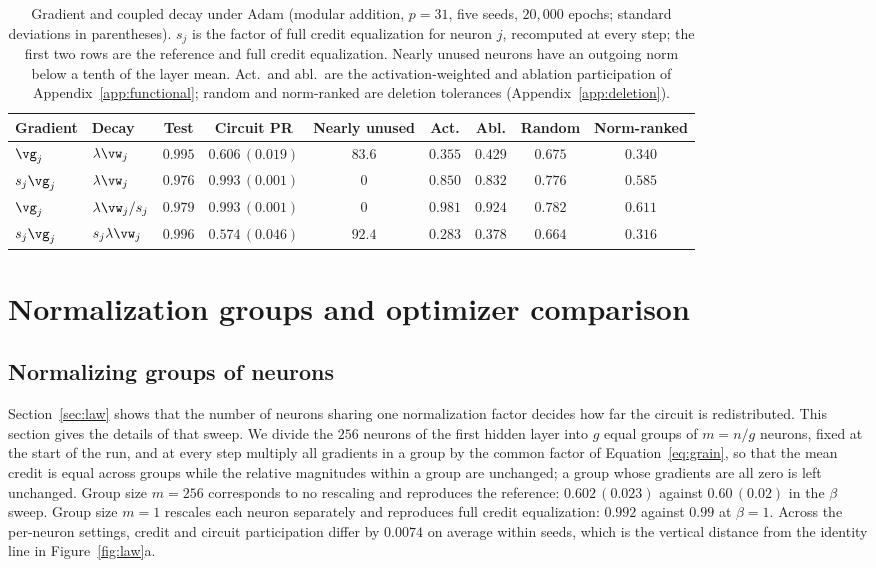 \documentclass{article} %
\begin{document}
\begin{table}[!ht]
\caption{Gradient and coupled decay under Adam (modular addition, $p=31$, five seeds, $20{,}000$ epochs; standard deviations in parentheses). $s_j$ is the factor of full credit equalization for neuron $j$, recomputed at every step; the first two rows are the reference and full credit equalization. Nearly unused neurons have an outgoing norm below a tenth of the layer mean. Act.\ and abl.\ are the activation-weighted and ablation participation of Appendix~\ref{app:functional}; random and norm-ranked are deletion tolerances (Appendix~\ref{app:deletion}).}
\label{tab:decay}
\begin{center}
\footnotesize
\setlength{\tabcolsep}{3pt}
\begin{tabular}{llccccccc}
\toprule
Gradient & Decay & Test & Circuit PR & Nearly unused & Act. & Abl. & Random & Norm-ranked \\
\midrule
$\vg_j$ & $\lambda \vw_j$ & $0.995$ & $0.606\,(0.019)$ & $83.6$ & $0.355$ & $0.429$ & $0.675$ & $0.340$ \\
$s_j \vg_j$ & $\lambda \vw_j$ & $0.976$ & $0.993\,(0.001)$ & $0$ & $0.850$ & $0.832$ & $0.776$ & $0.585$ \\
$\vg_j$ & $\lambda \vw_j / s_j$ & $0.979$ & $0.993\,(0.001)$ & $0$ & $0.981$ & $0.924$ & $0.782$ & $0.611$ \\
$s_j \vg_j$ & $s_j \lambda \vw_j$ & $0.996$ & $0.574\,(0.046)$ & $92.4$ & $0.283$ & $0.378$ & $0.664$ & $0.316$ \\
\bottomrule
\end{tabular}
\end{center}
\end{table}

\section{Normalization groups and optimizer comparison}
\label{app:groups_opt}

\subsection{Normalizing groups of neurons}
\label{app:grain}
Section~\ref{sec:law} shows that the number of neurons sharing one normalization factor decides how far the circuit is redistributed. This section gives the details of that sweep. We divide the $256$ neurons of the first hidden layer into $g$ equal groups of $m = n/g$ neurons, fixed at the start of the run, and at every step multiply all gradients in a group by the common factor of Equation~\ref{eq:grain}, so that the mean credit is equal across groups while the relative magnitudes within a group are unchanged; a group whose gradients are all zero is left unchanged. Group size $m = 256$ corresponds to no rescaling and reproduces the reference: $0.602\,(0.023)$ against $0.60\,(0.02)$ in the $\beta$ sweep. Group size $m = 1$ rescales each neuron separately and reproduces full credit equalization: $0.992$ against $0.99$ at $\beta = 1$. Across the per-neuron settings, credit and circuit participation differ by $0.0074$ on average within seeds, which is the vertical distance from the identity line in Figure~\ref{fig:law}a.
\end{document}
